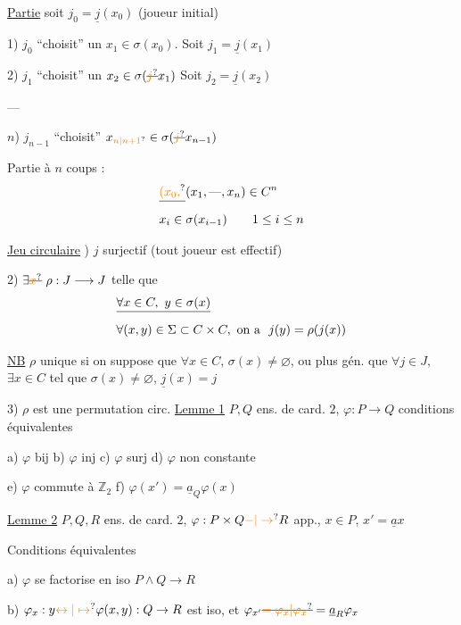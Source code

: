 \uline{Partie} \qquad soit $j_0=\underline{j}(x_0)$ \qquad (joueur initial)

1) $j_0$ ``choisit'' un $x_1\in\sigma(x_0)$. Soit $j_1=\underline{j}(x_1)$

2) $j_1$ ``choisit'' un $x_2\in\sigma(\deleted{\unsure{j}}x_1)$ \qquad Soit $j_2=\underline{j}(x_2)$

---

$n$) $j_{n-1}$ ``choisit'' $x_{\unsure{n|n+1}}\in\sigma(\deleted{\unsure{j}}x_{n-1})$

Partie à $n$ coups :
\[
\begin{aligned}
&\deleted{\unsure{(x_0,}}(x_1,\text{---},x_n)\in C^n\\
&x_i\in\sigma(x_{i-1})\qquad 1\leq i\leq n
\end{aligned}
\]

\uline{Jeu circulaire} ) $j$ surjectif (tout joueur est effectif)

2) $\exists\deleted{\unsure{x}}\ \rho:J\longrightarrow J$ telle que
\[
\begin{aligned}
&\deleted{\forall x\in C,\ y\in\sigma(x)}\\
&\forall(x,y)\in\Sigma\subset C\times C,\text{ on a }\ j(y)=\rho(j(x))
\end{aligned}
\]

\uline{NB} $\rho$ unique si on suppose que $\forall x\in C$,  $\sigma(x)\neq\varnothing$, ou plus gén. que $\forall j\in J$, $\exists x\in C$ tel que $\sigma(x)\neq\varnothing$, $\underline{j}(x)=j$

3) $\rho$ est une permutation circ.
\uline{Lemme 1} \quad $P,Q$ ens. de card. $2$,  $\varphi:P\to Q$ conditions équivalentes

a) $\varphi$ bij \qquad b) $\varphi$ inj \qquad c) $\varphi$ surj \qquad d) $\varphi$ non constante

e) $\varphi$ commute à $\mathbb{Z}_2$ \qquad f) $\varphi(x')=\underline a_Q\varphi(x)$

\uline{Lemme 2} \quad $P,Q,R$ ens. de card. $2$, $\varphi:P\times Q\unsure{-|\to}R$ app., $x\in P$, $x'=\underline a x$

Conditions équivalentes

a) $\varphi$ se factorise en iso \qquad $P\wedge Q\to R$

b) $\varphi_x:y\unsure{\leftrightarrow|\mapsto}\varphi(x,y):Q\to R$ est iso, et $\varphi_{x'}\deleted{\unsure{=\varphi_x|\varphi_x}}=\underline a_R\varphi_x$

